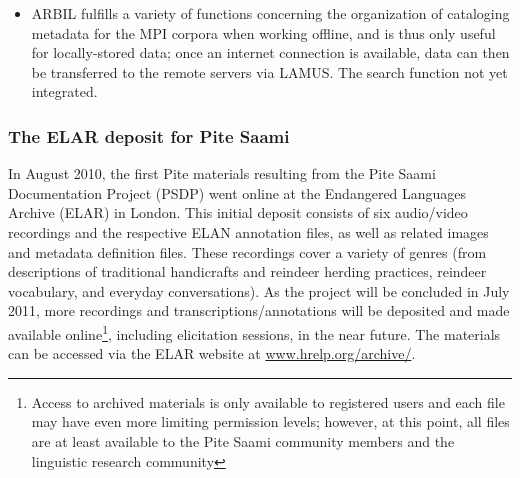 \documentclass[a4paper,12pt]{article}
\begin{document}
\begin{itemize}
\item ARBIL fulfills a variety of functions concerning the organization of cataloging metadata for the MPI corpora when working offline, and is thus only useful for locally-stored data; once an internet connection is available, data can then be transferred to the remote servers via LAMUS. The search function not yet integrated. %
\end{itemize}


\subsubsection{The ELAR deposit for Pite Saami}%
In August 2010, the first Pite materials resulting from the Pite Saami Documentation Project (PSDP) went online at the Endangered Languages Archive (ELAR) in London. This initial deposit consists of six audio/video recordings and the respective ELAN annotation files, as well as related images and metadata definition files. These recordings cover a variety of genres (from descriptions of traditional handicrafts and reindeer herding practices, reindeer vocabulary, and everyday conversations). As the project will be concluded in July 2011, more recordings and transcriptions/annotations will be deposited and made available online\footnote{Access to archived materials is only available to registered users and each file may have even more limiting permission levels; however, at this point, all files are at least available to the Pite Saami community members and the linguistic research community}, including elicitation sessions, in the near future. The materials can be accessed via the ELAR website at \url{www.hrelp.org/archive/}.
\end{document}
